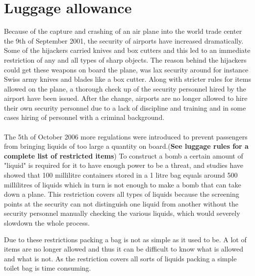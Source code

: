 \section{Luggage allowance}

Because of the capture and crashing of an air plane into the world trade center the 9th of September 2001, the security of airports have increased dramatically. Some of the hijackers carried knives and box cutters and this led to an immediate restriction of any and all types of sharp objects. The reason behind the hijackers could get these weapons on board the plane, was lax security around for instance Swiss army knives and blades like a box cutter. Along with stricter rules for items allowed on the plane, a thorough check up of the security personnel hired by the airport have been issued. After the change, airports are no longer allowed to hire their own security personnel due to a lack of discipline and training and in some cases hiring of personnel with a criminal background.\citep{Stricter_rules}\\
\\
The 5th of October 2006 more regulations were introduced to prevent passengers from bringing liquids of too large a quantity on board.(\textbf{See luggage rules for a complete list of restricted items}) To construct a bomb a certain amount of "liquid" is required for it to have enough power to be a threat, and studies have showed that 100 millilitre containers stored in a 1 litre bag equals around 500 millilitres of liquids which in turn is not enough to make a bomb that can take down a plane. This restriction covers all types of liquids because the screening points at the security can not distinguish one liquid from another without the security personnel manually checking the various liquids, which would severely slowdown the whole process.\citep{Why_rules}\newline

Due to these restrictions packing a bag is not as simple as it used to be. A lot of items are no longer allowed and thus it can be difficult to know what is allowed and what is not. As the restriction covers all sorts of liquids packing a simple toilet bag is time consuming.
